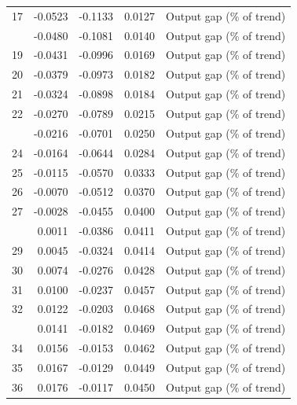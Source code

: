\begin{tabular}{rrrrl}
17 & -0.0523 & -0.1133 & 0.0127 & Output gap (\% of trend)\\
\addlinespace
18 & -0.0480 & -0.1081 & 0.0140 & Output gap (\% of trend)\\
19 & -0.0431 & -0.0996 & 0.0169 & Output gap (\% of trend)\\
20 & -0.0379 & -0.0973 & 0.0182 & Output gap (\% of trend)\\
21 & -0.0324 & -0.0898 & 0.0184 & Output gap (\% of trend)\\
22 & -0.0270 & -0.0789 & 0.0215 & Output gap (\% of trend)\\
\addlinespace
23 & -0.0216 & -0.0701 & 0.0250 & Output gap (\% of trend)\\
24 & -0.0164 & -0.0644 & 0.0284 & Output gap (\% of trend)\\
25 & -0.0115 & -0.0570 & 0.0333 & Output gap (\% of trend)\\
26 & -0.0070 & -0.0512 & 0.0370 & Output gap (\% of trend)\\
27 & -0.0028 & -0.0455 & 0.0400 & Output gap (\% of trend)\\
\addlinespace
28 & 0.0011 & -0.0386 & 0.0411 & Output gap (\% of trend)\\
29 & 0.0045 & -0.0324 & 0.0414 & Output gap (\% of trend)\\
30 & 0.0074 & -0.0276 & 0.0428 & Output gap (\% of trend)\\
31 & 0.0100 & -0.0237 & 0.0457 & Output gap (\% of trend)\\
32 & 0.0122 & -0.0203 & 0.0468 & Output gap (\% of trend)\\
\addlinespace
33 & 0.0141 & -0.0182 & 0.0469 & Output gap (\% of trend)\\
34 & 0.0156 & -0.0153 & 0.0462 & Output gap (\% of trend)\\
35 & 0.0167 & -0.0129 & 0.0449 & Output gap (\% of trend)\\
36 & 0.0176 & -0.0117 & 0.0450 & Output gap (\% of trend)\\
\bottomrule
\end{tabular}
